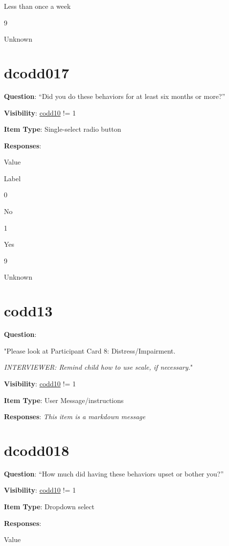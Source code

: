\documentclass[]{book}
\begin{document}
Less than once a week

9

Unknown

\hypertarget{dcodd017}{%
\section{dcodd017}\label{dcodd017}}

\textbf{Question}: ``Did you do these behaviors for at least six months or more?''

\textbf{Visibility}: \protect\hyperlink{codd10}{codd10} != 1

\textbf{Item Type}: Single-select radio button

\textbf{Responses}:

Value

Label

0

No

1

Yes

9

Unknown

\hypertarget{codd13}{%
\section{codd13}\label{codd13}}

\textbf{Question}:

"Please look at Participant Card 8: Distress/Impairment.

\emph{INTERVIEWER: Remind child how to use scale, if necessary.}"

\textbf{Visibility}: \protect\hyperlink{codd10}{codd10} != 1

\textbf{Item Type}: User Message/instructions

\textbf{Responses}: \emph{This item is a markdown message}

\hypertarget{dcodd018}{%
\section{dcodd018}\label{dcodd018}}

\textbf{Question}: ``How much did having these behaviors upset or bother you?''

\textbf{Visibility}: \protect\hyperlink{codd10}{codd10} != 1

\textbf{Item Type}: Dropdown select

\textbf{Responses}:

Value
\end{document}

